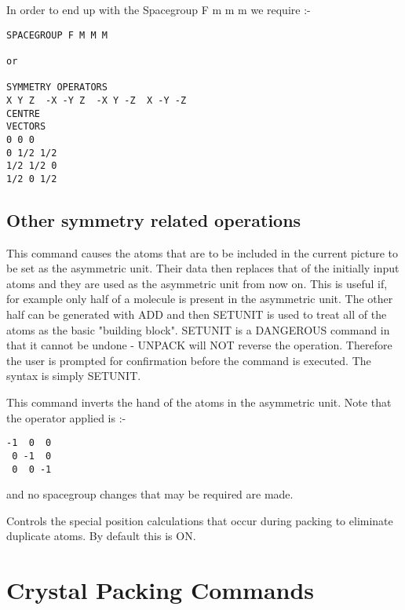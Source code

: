 \documentclass[10pt,a4paper]{report}
\begin{document}
In order to end up with the Spacegroup F m m m we require :-

\small\begin{verbatim}
SPACEGROUP F M M M

or

SYMMETRY OPERATORS
X Y Z  -X -Y Z  -X Y -Z  X -Y -Z
CENTRE
VECTORS
0 0 0
0 1/2 1/2
1/2 1/2 0
1/2 0 1/2
\end{verbatim}\normalsize


\section{Other symmetry related operations}


\bigskip{}




This command causes the atoms that are to be included in the
current
picture to be set as the asymmetric unit. Their data then
replaces that
of the initially input atoms and they are used as the asymmetric
unit
from now on. This is useful if, for example only half of a
molecule is
present in the asymmetric unit. The other half can be generated
with ADD
and then SETUNIT is used to treat all of the atoms as the basic
"building block". SETUNIT is a DANGEROUS command in that it
cannot be
undone - UNPACK will NOT reverse the operation. Therefore the
user is
prompted for confirmation before the command is executed. The
syntax is
simply SETUNIT.


\bigskip{}


This command inverts the hand of the atoms in the asymmetric unit. Note
that the operator applied is :-

\small\begin{verbatim}
-1  0  0
 0 -1  0
 0  0 -1
\end{verbatim}\normalsize


and no spacegroup changes that may be required are made.


\bigskip{}




\bigskip{}


\bigskip{}
Controls the special position calculations that occur during packing to 
eliminate duplicate atoms. By default this is ON.



\chapter{Crystal Packing Commands}
\end{document}
